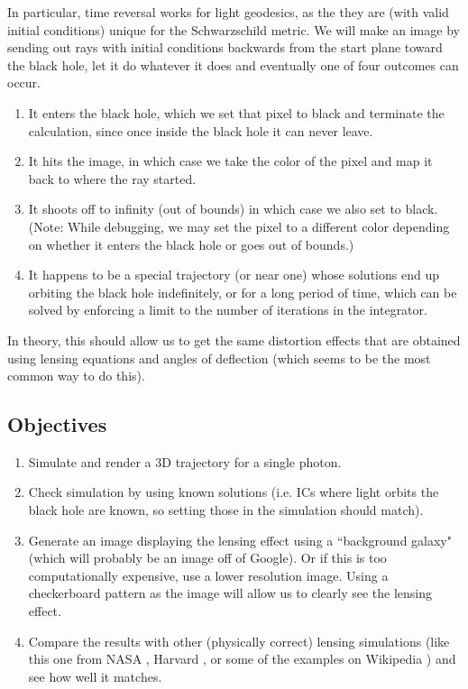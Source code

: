 \documentclass{article}
\begin{document}
In particular, time reversal works for light geodesics, as the they are (with valid initial conditions) unique for the Schwarzschild metric. We will make an image by sending out rays with initial conditions backwards from the start plane toward the black hole, let it do whatever it does and eventually one of four outcomes can occur. 
\begin{enumerate}
	\item It enters the black hole, which we set that pixel to black and terminate the calculation, since once inside the black hole it can never leave.
	\item It hits the image, in which case we take the color of the pixel and map it back to where the ray started.
	\item It shoots off to infinity (out of bounds) in which case we also set to black. (Note: While debugging, we may set the pixel to a different color depending on whether it enters the black hole or goes out of bounds.)
	\item It happens to be a special trajectory (or near one) whose solutions end up orbiting the black hole indefinitely, or for a long period of time, which can be solved by enforcing a limit to the number of iterations in the integrator.
\end{enumerate}
In theory, this should allow us to get the same distortion effects that are obtained using lensing equations and angles of deflection (which seems to be the most common way to do this). 

\subsection*{Objectives}
\begin{enumerate}
	\item Simulate and render a 3D trajectory for a single photon.
	\item Check simulation by using known solutions (i.e. ICs where light orbits the black hole are known, so setting those in the simulation should match).
	\item Generate an image displaying the lensing effect using a ``background galaxy" (which will probably be an image off of Google). Or if this is too computationally expensive, use a lower resolution image. Using a checkerboard pattern as the image will allow us to clearly see the lensing effect. 
	\item Compare the results with other (physically correct) lensing simulations (like this one from NASA \cite{NASA}, Harvard \cite{Harvard}, or some of the examples on Wikipedia \cite{Wikipedia}) and see how well it matches.
\end{enumerate}
\end{document}
